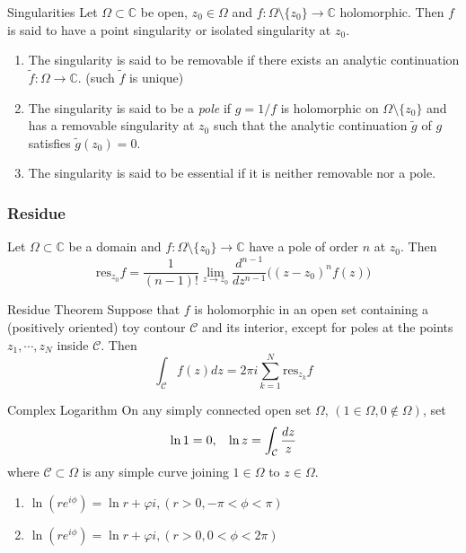 \documentclass{beamer}
\begin{document}
\begin{frame}
\begin{block}{Singularities}
Let $\Omega\subset\mathbb{C}$ be open, $z_0\in\Omega$ and $f:\Omega\setminus\lbrace z_0\rbrace\rightarrow\mathbb{C}$ holomorphic. Then $f$ is said to have a point singularity or isolated singularity at $z_0$.
\begin{enumerate}
\item The singularity is said to be removable if there exists an analytic continuation $\tilde{f}:\Omega\rightarrow\mathbb{C}$. (such $\tilde{f} $ is unique)
\item The singularity is said to be a \textcolor[rgb]{0,0.6,0.3}{\textit{pole}} if $g=1/f$ is holomorphic on $\Omega\setminus\lbrace z_0\rbrace$ and has a removable singularity at $z_0$ such that the analytic continuation $\tilde{g}$ of $g$ satisfies $\tilde{g}(z_0)=0$.
\item The singularity is said to be essential if it is neither removable nor a pole.
\end{enumerate}
\end{block}
\end{frame}

\begin{frame}
\frametitle{Residue}
Let $\Omega\subset\mathbb{C}$ be a domain and $f:\Omega\setminus\lbrace z_0\rbrace\rightarrow\mathbb{C}$ have a pole of order $n$ at $z_0$. Then
$$\text{res}_{z_0}f=\dfrac{1}{(n-1)!}\lim_{z\rightarrow z_0}\dfrac{d^{n-1}}{dz^{n-1}}\big((z-z_0)^nf(z)\big)$$ 

\begin{block}{Residue Theorem}
Suppose that $f$ is holomorphic in an open set containing a (positively oriented) toy contour $\mathcal{C}$ and its interior, except for poles at the points $z_1,\cdots,z_N$ inside $\mathcal{C}$. Then
$$\int_{\mathcal{C}}f(z)dz=2\pi i\sum\limits_{k=1}^N\text{res}_{z_k}f$$
\end{block}

\end{frame}

\begin{frame}
\begin{block}{Complex Logarithm}
On any simply connected open set $\Omega$, $(1\in\Omega,0\notin\Omega)$, set
$$\ln 1=0,\hspace{3mm}\ln z=\int_{\mathcal{C}}\dfrac{dz}{z}$$
where $\mathcal{C}\subset\Omega$ is any simple curve joining $1\in\Omega$ to $z\in\Omega$.
\begin{enumerate}
\item $\ln(re^{i\phi})=\ln r+\varphi i, (r>0,-\pi<\phi<\pi)$
\item $\ln(re^{i\phi})=\ln r+\varphi i, (r>0,0<\phi<2\pi)$
\end{enumerate}
\end{block}
\end{frame}
\end{document}
